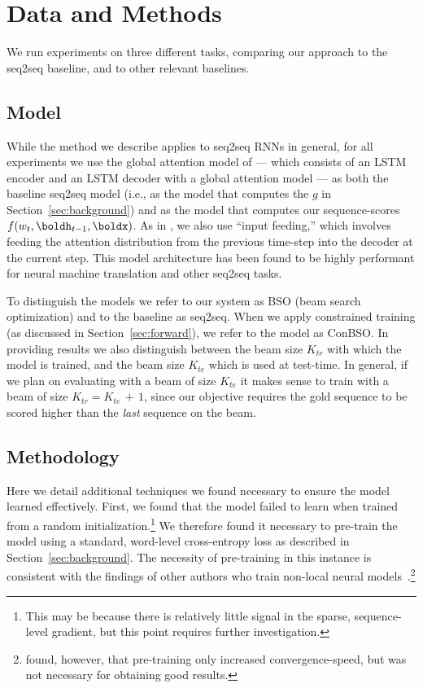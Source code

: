\section{Data and Methods}
We run experiments on three different tasks, comparing our approach to
the seq2seq baseline, and to other relevant baselines.

\subsection{Model}
While the method we describe applies to seq2seq RNNs in general,
for all experiments we use the global attention model of  ---
which consists of an LSTM~\cite{hochreiter1997lstm} encoder and an
LSTM decoder with a global attention model --- as both the baseline
seq2seq model (i.e., as the model that computes the $g$ in
Section~\ref{sec:background}) and as the model that computes our
sequence-scores $f(w_{t}, \boldh_{t-1}, \boldx)$. As in , we also use
``input feeding,'' which involves feeding the attention distribution
from the previous time-step into the decoder at the current step. 
This model architecture has been found to be highly performant for neural
machine translation and other seq2seq tasks. 

To distinguish the models we refer to our system as BSO (beam search
optimization) and to the baseline as seq2seq. When we apply constrained training (as discussed in Section~\ref{sec:forward}), we refer to the model as ConBSO. In providing results we also distinguish between the
beam size $K_{tr}$ with which the model is trained, and the beam size
$K_{te}$ which is used at test-time. In general, if we plan on
evaluating with a beam of size $K_{te}$ it makes sense to train with a
beam of size $K_{tr} = K_{te} \, {+} \, 1$, since our objective requires the
gold sequence to be scored higher than the \textit{last} sequence on
the beam.

\subsection{Methodology}
Here we detail additional techniques we found necessary to ensure the model learned effectively. First, we found that the model failed to learn when trained
from a random initialization.\footnote{This may be because there is relatively little signal in the sparse, sequence-level gradient, but this point requires further investigation.} We therefore found it necessary to pre-train the model using a standard,
word-level cross-entropy loss as described in
Section~\ref{sec:background}. The necessity of pre-training in this instance is consistent with the findings of other authors who train non-local neural models~\cite{kingsbury09lattice,sak14sequence,andor16globally,ranzato16sequence}.\footnote{ found, however, that pre-training only increased convergence-speed, but was not necessary for obtaining good results.}

